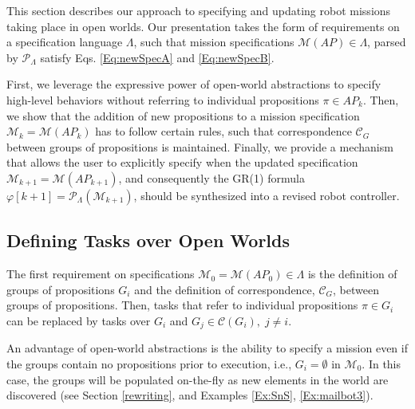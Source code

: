 This section describes our approach to specifying and updating robot missions taking place in open worlds. 
Our presentation takes the form of requirements on a specification language $\Lambda$, such that mission specifications $\mathcal{M}(AP) \in \Lambda$, parsed by $\mathcal{P}_{\Lambda}$ satisfy Eqs. \eqref{Eq:newSpecA} and \eqref{Eq:newSpecB}. 

First, we leverage the expressive power of open-world abstractions to specify high-level behaviors without referring to individual propositions $\pi \in AP_k$. 
Then, we show that the addition of new propositions to a mission specification $\mathcal{M}_k = \mathcal{M}(AP_k)$ has to follow certain rules, such that correspondence $\mathcal{C}_G$ between groups of propositions is maintained.
Finally, we provide a mechanism that allows the user to explicitly specify when the updated specification $\mathcal{M}_{k+1} = \mathcal{M}(AP_{k+1})$, and consequently the GR(1) formula 
$\varphi [k+1] = \mathcal{P}_{\Lambda} (\mathcal{M}_{k+1})$,
should be synthesized into a revised robot controller.

\subsection{Defining Tasks over Open Worlds}

The first requirement on specifications $\mathcal{M}_0 = \mathcal{M}(AP_0) \in \Lambda$ is the definition of groups of propositions $G_i$ and the definition of correspondence, $\mathcal{C}_G$, between groups of propositions. Then, tasks that refer to individual propositions $\pi \in G_i$ can be replaced by tasks over $G_i$ and $G_j \in \mathcal{C}(G_i), \; j \not = i$.

An advantage of open-world abstractions is the ability to specify a mission even if the groups contain no propositions prior to execution, i.e., $G_i = \emptyset$ in $\mathcal{M}_0$. In this case, the groups will be populated on-the-fly as new elements in the world are discovered (see Section \ref{rewriting}, and Examples \ref{Ex:SnS}, \ref{Ex:mailbot3}).


